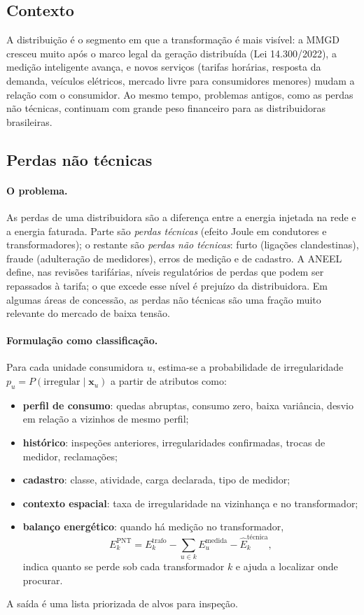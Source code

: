 \documentclass[11pt,a4paper]{article}
\begin{document}
\subsection{Contexto}

A distribuição é o segmento em que a transformação é mais visível: a
MMGD cresceu muito após o marco legal da geração distribuída (Lei
14.300/2022), a medição inteligente avança, e novos serviços (tarifas
horárias, resposta da demanda, veículos elétricos, mercado livre para
consumidores menores) mudam a relação com o consumidor. Ao mesmo tempo,
problemas antigos, como as perdas não técnicas, continuam com grande peso
financeiro para as distribuidoras brasileiras.

\subsection{Perdas não técnicas}

\paragraph{O problema.} As perdas de uma distribuidora são a diferença entre a
energia injetada na rede e a energia faturada. Parte são \emph{perdas
técnicas} (efeito Joule em condutores e transformadores); o restante são
\emph{perdas não técnicas}: furto (ligações clandestinas), fraude (adulteração
de medidores), erros de medição e de cadastro. A ANEEL define, nas revisões
tarifárias, níveis regulatórios de perdas que podem ser repassados à tarifa;
o que excede esse nível é prejuízo da distribuidora. Em algumas áreas de
concessão, as perdas não técnicas são uma fração muito relevante do mercado
de baixa tensão.

\paragraph{Formulação como classificação.} Para cada unidade consumidora $u$,
estima-se a probabilidade de irregularidade
$p_u = P(\text{irregular} \mid \mathbf{x}_u)$ a partir de atributos como:
\begin{itemize}
  \item \textbf{perfil de consumo}: quedas abruptas, consumo zero, baixa
    variância, desvio em relação a vizinhos de mesmo perfil;
  \item \textbf{histórico}: inspeções anteriores, irregularidades
    confirmadas, trocas de medidor, reclamações;
  \item \textbf{cadastro}: classe, atividade, carga declarada, tipo de
    medidor;
  \item \textbf{contexto espacial}: taxa de irregularidade na vizinhança e no
    transformador;
  \item \textbf{balanço energético}: quando há medição no transformador,
    \begin{equation}
      E^{\text{PNT}}_{k} = E^{\text{trafo}}_{k} - \sum_{u \in k} E^{\text{medida}}_{u}
      - \hat{E}^{\text{técnica}}_{k},
    \end{equation}
    indica quanto se perde sob cada transformador $k$ e ajuda a localizar
    onde procurar.
\end{itemize}
A saída é uma lista priorizada de alvos para inspeção.
\end{document}
